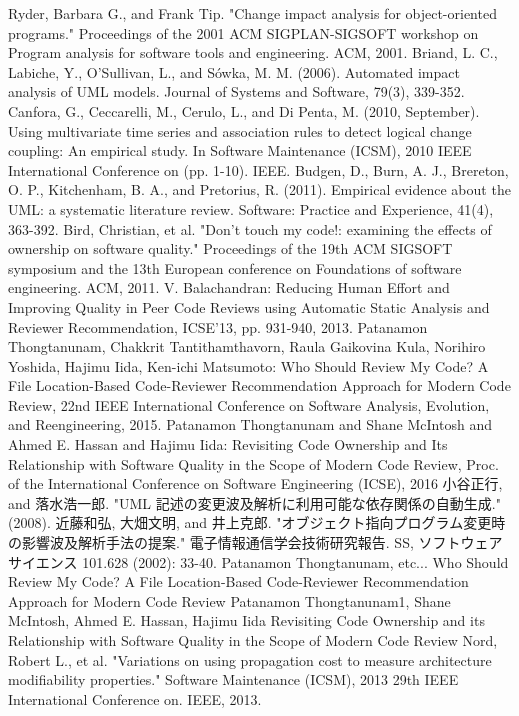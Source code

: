 \documentclass{fose2016}           %
\begin{document}
\begin{thebibliography}{10}
Ryder, Barbara G., and Frank Tip. "Change impact analysis for object-oriented programs." Proceedings of the 2001 ACM SIGPLAN-SIGSOFT workshop on Program analysis for software tools and engineering. ACM, 2001.
Briand, L. C., Labiche, Y., O’Sullivan, L., and Sówka, M. M. (2006). Automated impact analysis of UML models. Journal of Systems and Software, 79(3), 339-352.
 Canfora, G., Ceccarelli, M., Cerulo, L., and Di Penta, M. (2010, September). Using multivariate time series and association rules to detect logical change coupling: An empirical study. In Software Maintenance (ICSM), 2010 IEEE International Conference on (pp. 1-10). IEEE.
Budgen, D., Burn, A. J., Brereton, O. P., Kitchenham, B. A., and Pretorius, R. (2011). Empirical evidence about the UML: a systematic literature review. Software: Practice and Experience, 41(4), 363-392.
Bird, Christian, et al. "Don't touch my code!: examining the effects of ownership on software quality." Proceedings of the 19th ACM SIGSOFT symposium and the 13th European conference on Foundations of software engineering. ACM, 2011.
V. Balachandran: Reducing Human Effort and Improving Quality in Peer Code Reviews using Automatic Static Analysis and Reviewer Recommendation, ICSE'13, pp. 931-940, 2013.
Patanamon Thongtanunam, Chakkrit Tantithamthavorn, Raula Gaikovina Kula, Norihiro Yoshida, Hajimu Iida, Ken-ichi Matsumoto: Who Should Review My Code? A File Location-Based Code-Reviewer Recommendation Approach for Modern Code Review, 22nd IEEE International Conference on Software Analysis, Evolution, and Reengineering, 2015.
Patanamon Thongtanunam and Shane McIntosh and Ahmed E. Hassan and Hajimu Iida: Revisiting Code Ownership and Its Relationship with Software Quality in the Scope of Modern Code Review, Proc. of the International Conference on Software Engineering (ICSE), 2016
小谷正行, and 落水浩一郎. "UML 記述の変更波及解析に利用可能な依存関係の自動生成." (2008).
近藤和弘, 大畑文明, and 井上克郎. "オブジェクト指向プログラム変更時の影響波及解析手法の提案." 電子情報通信学会技術研究報告. SS, ソフトウェアサイエンス 101.628 (2002): 33-40.
Patanamon Thongtanunam, etc...
Who Should Review My Code? A File Location-Based Code-Reviewer Recommendation Approach for Modern Code Review
Patanamon Thongtanunam1, Shane McIntosh, Ahmed E. Hassan, Hajimu Iida Revisiting Code Ownership and its Relationship with Software Quality in the Scope of Modern Code Review
Nord, Robert L., et al. "Variations on using propagation cost to measure architecture modifiability properties." Software Maintenance (ICSM), 2013 29th IEEE International Conference on. IEEE, 2013.


\end{thebibliography}
\end{document}
